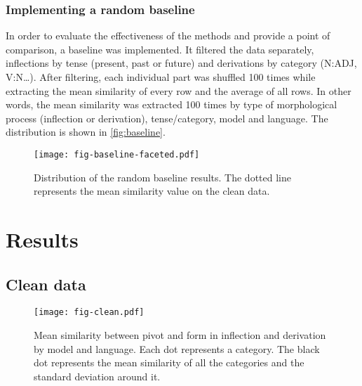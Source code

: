 \documentclass[12pt]{article}
\begin{document}

\subsubsection{Implementing a random baseline}

In order to evaluate the effectiveness of the methods and provide a point of comparison, a baseline was implemented. It filtered the data separately, inflections by tense (present, past or future) and derivations by category (N:ADJ, V:N\dots). After filtering, each individual part was shuffled 100 times while extracting the mean similarity of every row and the average of all rows. In other words, the mean similarity was extracted 100 times by type of morphological process (inflection or derivation), tense/category, model and language. The distribution is shown in \autoref{fig:baseline}.

\begin{figure}[H]
\centering
\texttt{[image: fig-baseline-faceted.pdf]}
\caption{Distribution of the random baseline results. The dotted line represents the mean similarity value on the clean data.}
\label{fig:baseline}
\end{figure}


\section{Results}

\subsection{Clean data}

\begin{figure}[h!]
\centering
\texttt{[image: fig-clean.pdf]}
\caption{Mean similarity between pivot and form in inflection and derivation by model and language. Each dot represents a category. The black dot represents the mean similarity of all the categories and the standard deviation around it.}
\label{fig:clean-data}
\end{figure}
\end{document}

